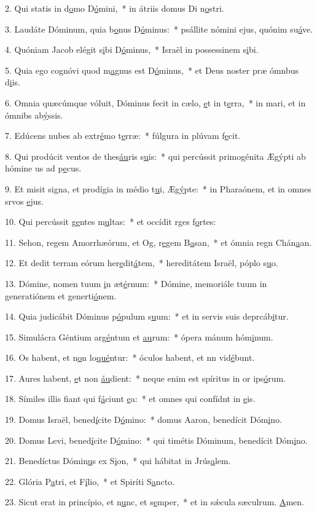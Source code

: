 2. Qui statis in d\uline{o}mo D\uline{ó}mini,~* in átriis domus Di n\uline{o}stri.\par 
3. Laudáte Dóminum, quia b\uline{o}nus D\uline{ó}minus:~* psállite nómini ejus, quónim su\uline{á}ve.\par 
4. Quóniam Jacob elégit s\uline{i}bi D\uline{ó}minus,~* Israël in possessinem s\uline{i}bi.\par 
5. Quia ego cognóvi quod m\uline{a}gnus est D\uline{ó}minus,~* et Deus noster præ ómnbus d\uline{i}is.\par 
6. Omnia quæcúmque vóluit, Dóminus fecit in cælo, \uline{e}t in t\uline{e}rra,~* in mari, et in ómnibs ab\uline{ý}ssis.\par 
7. Edúcens nubes ab extr\uline{é}mo t\uline{e}rræ:~* fúlgura in plúvam f\uline{e}cit.\par 
8. Qui prodúcit ventos de thes\uline{áu}ris s\uline{u}is:~* qui percússit primogénita Ægýpti ab hómine us ad p\uline{e}cus.\par 
9. Et misit signa, et prodígia in médio t\uline{u}i, Æg\uline{ý}pte:~* in Pharaónem, et in omnes srvos \uline{e}jus.\par 
10. Qui percússit g\uline{e}ntes m\uline{u}ltas:~* et occídit rges f\uline{o}rtes:\par 
11. Sehon, regem Amorrhæórum, et Og, r\uline{e}gem B\uline{a}san,~* et ómnia regn Chán\uline{a}an.\par 
12. Et dedit terram eórum her\uline{e}dit\uline{á}tem,~* hereditátem Israël, póplo s\uline{u}o.\par 
13. Dómine, nomen tuum \uline{i}n æt\uline{é}rnum:~* Dómine, memoriále tuum in generatiónem et generti\uline{ó}nem.\par 
14. Quia judicábit Dóminus p\uline{ó}pulum s\uline{u}um:~* et in servis suis deprcáb\uline{i}tur.\par 
15. Simulácra Géntium arg\uline{é}ntum et \uline{au}rum:~* ópera mánum hóm\uline{i}num.\par 
16. Os habent, et n\uline{o}n lo\uline{qué}ntur:~* óculos habent, et nn vid\uline{é}bunt.\par 
17. Aures habent, \uline{e}t non \uline{áu}dient:~* neque enim est spíritus in or ips\uline{ó}rum.\par 
18. Símiles illis fiant qui f\uline{á}ciunt \uline{e}a:~* et omnes qui confídnt in \uline{e}is.\par 
19. Domus Israël, bened\uline{í}cite D\uline{ó}mino:~* domus Aaron, benedícit Dóm\uline{i}no.\par 
20. Domus Levi, bened\uline{í}cite D\uline{ó}mino:~* qui timétis Dóminum, benedícit Dóm\uline{i}no.\par 
21. Benedíctus Dómin\uline{u}s ex S\uline{i}on,~* qui hábitat in Jrús\uline{a}lem.\par 
22. Glória P\uline{a}tri, et F\uline{í}lio,~* et Spiríti S\uline{a}ncto.\par 
23. Sicut erat in princípio, et n\uline{u}nc, et s\uline{e}mper,~* et in sǽcula sæculrum. \uline{A}men.\par 

